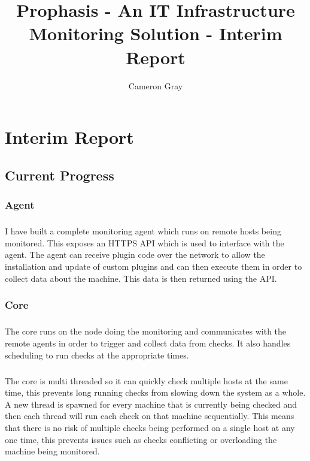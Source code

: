 \documentclass[bsc,logo,twoside]{infthesis}
\title{Prophasis - An IT Infrastructure Monitoring Solution - Interim Report}
\author{Cameron Gray}
\begin{document}
\maketitle
\tableofcontents

\chapter{Interim Report}
\section{Current Progress}
\subsection{Agent}
\paragraph*{}
	I have built a complete monitoring agent which runs on remote hosts being
	monitored. This exposes an HTTPS API which is used to interface with the
	agent.  The agent can receive plugin code over the network to allow the
	installation and update of custom plugins and can then execute them in order
	to collect data about the machine.  This data is then returned using the API.
	
\subsection{Core}
\paragraph*{}
	The core runs on the node doing the monitoring and communicates with the
	remote agents in order to trigger and collect data from checks.  It also
	handles scheduling to run checks at the appropriate times.

\paragraph*{}
	The core is
	multi threaded so it can quickly check multiple hosts at the same time, this
	prevents long running checks from slowing down the system as a whole.  A new
	thread is spawned for every machine that is currently being checked and then
	each thread will run each check on that machine sequentially. This means that
	there is no risk of multiple checks being performed on a single host at any
	one time, this prevents issues such as checks conflicting or overloading the
	machine being monitored.
	
\end{document}
